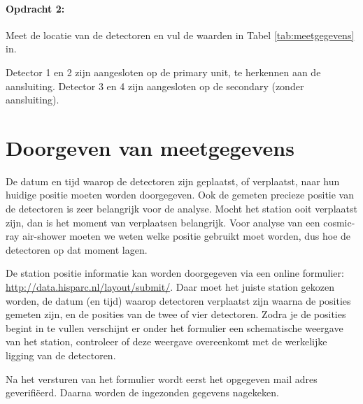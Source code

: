 \paragraph{Opdracht 2:}

Meet de locatie van de detectoren en vul de waarden in Tabel
\ref{tab:meetgegevens} in.

Detector 1 en 2 zijn aangesloten op de \hisparc primary unit, te herkennen aan
de \gps aansluiting. Detector 3 en 4 zijn aangesloten op de \hisparc secondary
(zonder \gps aansluiting).


\section{Doorgeven van meetgegevens}

De datum en tijd waarop de detectoren zijn geplaatst, of verplaatst,
naar hun huidige positie moeten worden doorgegeven. Ook de gemeten
precieze positie van de detectoren is zeer belangrijk voor de analyse.
Mocht het station ooit verplaatst zijn, dan is het moment van
verplaatsen belangrijk. Voor analyse van een cosmic-ray air-shower
moeten we weten welke positie gebruikt moet worden, dus hoe de
detectoren op dat moment lagen.

De station positie informatie kan worden doorgegeven via een online
formulier: \url{http://data.hisparc.nl/layout/submit/}. Daar moet het
juiste station gekozen worden, de datum (en tijd) waarop detectoren
verplaatst zijn waarna de posities gemeten zijn, en de posities van de
twee of vier detectoren. Zodra je de posities begint in te vullen
verschijnt er onder het formulier een schematische weergave van het
station, controleer of deze weergave overeenkomt met de werkelijke
ligging van de detectoren.

Na het versturen van het formulier wordt eerst het opgegeven mail adres
geverifiëerd. Daarna worden de ingezonden gegevens nagekeken.


